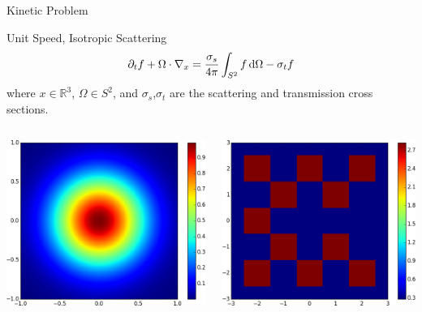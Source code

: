 \documentclass{beamer}
\renewcommand{\vec}[1]{\ensuremath{#1}}
\newcommand{\integral}[1]{\ensuremath{\int_{S^2} #1 \dif \Omega}}
\newcommand{\R}{\ensuremath{\mathbb{R}}\xspace}
\begin{document}
    \begin{frame}{Kinetic Problem}
        \begin{block}{Unit Speed, Isotropic Scattering}
            \begin{equation*}
                \partial_t f + \Omega \cdot \nabla_\vec{x} = \frac{\sigma_s}{4\pi} \integral{f} - \sigma_t f
            \end{equation*}
            where $x \in \R^3$, $\Omega \in S^2$, and $\sigma_s$,$\sigma_t$ are the scattering and transmission cross sections.
        \end{block}

        \vfill

        \begin{columns}
            \centering
            \includegraphics[width=\textwidth]{initcond_gaussian.png}

            \centering
            \includegraphics[width=\textwidth]{initcond_lattice-t.png}


\end{columns}
\end{frame}
\end{document}

